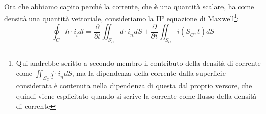 \documentclass{book}
\begin{document}
        Ora che abbiamo capito perché la corrente, che è una quantità scalare, ha come densità una quantità vettoriale, consideriamo la II° equazione di Maxwell\footnote{Qui andrebbe scritto a secondo membro il contributo della densità di corrente come $\iint_{S_{C}} \underline{j} \cdot \underline{i}_{n}dS$, ma la dipendenza della corrente dalla superficie considerata è contenuta nella dipendenza di questa dal proprio versore, che quindi viene esplicitato quando si scrive la corrente come flusso della densità di corrente}:
        \begin{equation}
            \oint_{C} \underline{h} \cdot \underline{i}_{l} dl = \frac{\partial}{\partial t} \iint_{S_{C}} \underline{d} \cdot \underline{i}_{n}dS + \frac{\partial}{\partial t} \iint_{S_{C}} i(\underline{S}_{C}, t)dS
        \end{equation}
        
\end{document}
